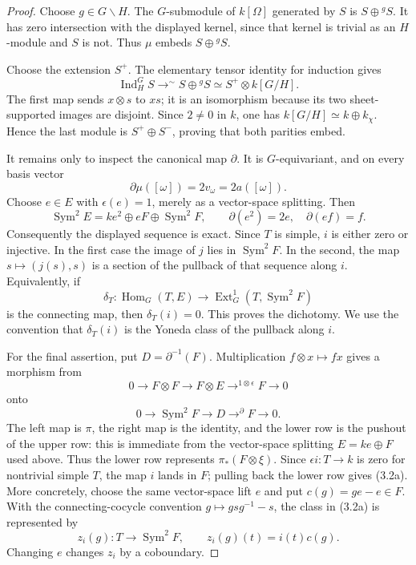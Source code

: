 \documentclass[11pt]{article}
\theoremstyle{definition}
\theoremstyle{remark}
\begin{document}
\begin{proof}
Choose \(g\in G\smallsetminus H\).  The \(G\)-submodule of
\(k[\Omega]\) generated by \(S\) is \(S\oplus{}^gS\).  It has zero
intersection with the displayed kernel, since that kernel is trivial
as an \(H\)-module and \(S\) is not.  Thus \(\mu\) embeds
\(S\oplus{}^gS\).

Choose the extension \(S^+\).  The elementary tensor identity for
induction gives
\[
 \operatorname{Ind}_H^G S
\mathrel{\mathop{\longrightarrow}^{\sim}}S\oplus{}^gS
 \simeq S^+\otimes k[G/H].
\]
The first map sends \(x\otimes s\) to \(xs\); it is an isomorphism
because its two sheet-supported images are disjoint.
Since \(2\ne0\) in \(k\), one has
\(k[G/H]\simeq k\oplus k_\chi\).  Hence the last module is
\(S^+\oplus S^-\), proving that both parities embed.

It remains only to inspect the canonical map \(\partial\).  It is
\(G\)-equivariant, and on every basis vector
\[
 \partial\mu([\omega])=2v_\omega=2a([\omega]).
\]
Choose \(e\in E\) with \(\epsilon(e)=1\), merely as
a vector-space splitting.  Then
\[
 \operatorname{Sym}^2E
 =ke^2\oplus eF\oplus\operatorname{Sym}^2F,
 \qquad
 \partial(e^2)=2e,\quad \partial(ef)=f.
\]
Consequently the displayed sequence is exact.  Since \(T\) is simple,
\(i\) is either zero or injective.  In the first case the image
of \(j\) lies in \(\operatorname{Sym}^2F\).  In the second, the map
\(s\mapsto(j(s),s)\) is a section of the pullback of that sequence along
\(i\).  Equivalently, if
\[
 \delta_T:\operatorname{Hom}_G(T,E)
 \longrightarrow\operatorname{Ext}^1_G
   (T,\operatorname{Sym}^2F)
\]
is the connecting map, then \(\delta_T(i)=0\).  This proves the
dichotomy.  We use the convention that \(\delta_T(i)\) is the Yoneda
class of the pullback along \(i\).

For the final assertion, put \(D=\partial^{-1}(F)\).  Multiplication
\(f\otimes x\mapsto fx\) gives a morphism from
\[
 0\longrightarrow F\otimes F\longrightarrow F\otimes E
 \mathrel{\mathop{\longrightarrow}^{1\otimes\epsilon}}F
 \longrightarrow0
\]
onto
\[
 0\longrightarrow\operatorname{Sym}^2F\longrightarrow D
 \mathrel{\mathop{\longrightarrow}^{\partial}}F
 \longrightarrow0.
\]
The left map is \(\pi\), the right map is the identity, and the lower
row is the pushout of the upper row: this is immediate from the
vector-space splitting \(E=ke\oplus F\) used above.  Thus the lower
row represents \(\pi_*(F\otimes\xi)\).  Since
\(\epsilon i:T\to k\) is zero for nontrivial simple \(T\), the map \(i\)
lands in \(F\); pulling back the lower row gives (3.2a).
More concretely, choose the same vector-space lift \(e\) and put
\(c(g)=ge-e\in F\).  With the connecting-cocycle convention
\(g\mapsto gsg^{-1}-s\), the class in (3.2a) is represented by
\[
 z_i(g):T\longrightarrow\operatorname{Sym}^2F,\qquad
 z_i(g)(t)=i(t)c(g).                                           \tag{3.2b}
\]
Changing \(e\) changes \(z_i\) by a coboundary.
\end{proof}
\end{document}

